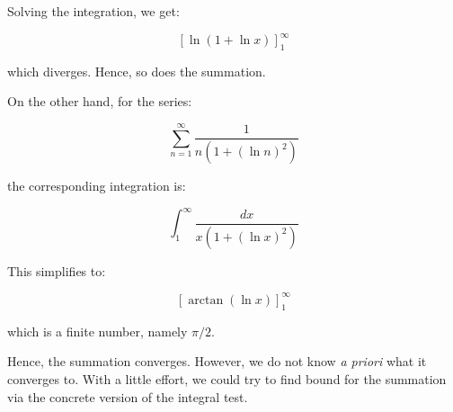 \documentclass{amsart}
\begin{document}
Solving the integration, we get:

$$[\ln(1 + \ln x)]_1^\infty$$

which diverges. Hence, so does the summation.

On the other hand, for the series:

$$\sum_{n=1}^\infty \frac{1}{n(1 + (\ln n)^2)}$$

the corresponding integration is:

$$\int_1^\infty \frac{dx}{x(1 + (\ln x)^2)}$$

This simplifies to:

$$[\arctan(\ln x)]_1^\infty$$

which is a finite number, namely $\pi/2$.

Hence, the summation converges. However, we do not know {\em a priori}
what it converges to. With a little effort, we could try to find bound
for the summation via the concrete version of the integral test.
\end{document}
